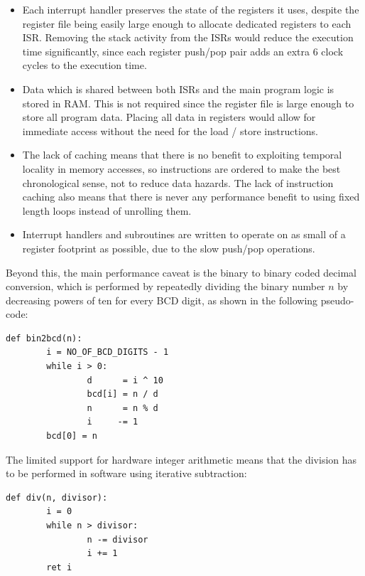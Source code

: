 \documentclass[12pt,a4paper]{article}
\begin{document}
\begin{itemize}
\item Each interrupt handler preserves the state of the registers it
  uses, despite the register file being easily large enough to
  allocate dedicated registers to each ISR. Removing the stack
  activity from the ISRs would reduce the execution time
  significantly, since each register push/pop pair adds an extra 6
  clock cycles to the execution time.
\item Data which is shared between both ISRs and the main program
  logic is stored in RAM. This is not required since the register file
  is large enough to store all program data. Placing all data in
  registers would allow for immediate access without the need for the
  load / store instructions.
\item The lack of caching means that there is no benefit to exploiting
  temporal locality in memory accesses, so instructions are ordered to
  make the best chronological sense, not to reduce data hazards. The
  lack of instruction caching also means that there is never any
  performance benefit to using fixed length loops instead of unrolling
  them.
\item Interrupt handlers and subroutines are written to operate on as
  small of a register footprint as possible, due to the slow push/pop
  operations.
\end{itemize}

\noindent
Beyond this, the main performance caveat is the binary to binary coded
decimal conversion, which is performed by repeatedly dividing the
binary number $n$ by decreasing powers of ten for every BCD digit, as
shown in the following pseudo-code:

\begin{verbatim}
def bin2bcd(n):
        i = NO_OF_BCD_DIGITS - 1
        while i > 0:
                d      = i ^ 10
                bcd[i] = n / d
                n      = n % d
                i     -= 1
        bcd[0] = n
\end{verbatim}

\noindent
The limited support for hardware integer arithmetic means that the
division has to be performed in software using iterative subtraction:

\begin{verbatim}
def div(n, divisor):
        i = 0
        while n > divisor:
                n -= divisor
                i += 1
        ret i
\end{verbatim}
\end{document}
